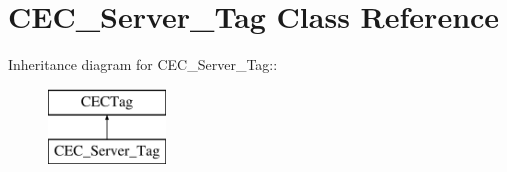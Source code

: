 \section{CEC\_\-Server\_\-Tag Class Reference}
\label{classCEC__Server__Tag}
Inheritance diagram for CEC\_\-Server\_\-Tag::\begin{figure}[H]
\begin{center}
\leavevmode
\includegraphics[height=2cm]{classCEC__Server__Tag}
\end{center}
\end{figure}
